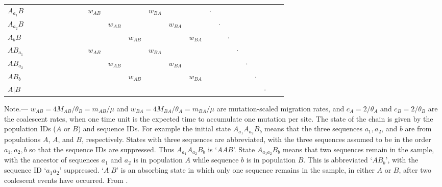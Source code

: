 \documentclass{article1}
\begin{document}
\begin{table}
\begin{small}
\begin{tabular}{lccccccccccccccccccccccc}
			$A_{a_1}B$ & & & & & & & & & $w_{AB}$ & & & $w_{BA}$ & & & $\cdot$ & & & & & & \\
			$A_{a_2}B$ & & & & & & & & & & $w_{AB}$ & & & $w_{BA}$ & & & $\cdot$ & & & & & \\
			$A_bB$ & & & & & & & & & & & $w_{AB}$ & & & $w_{BA}$ & & & $\cdot$ & & & & \\
			$AB_{a_1}$ & & & & & & & & & $w_{AB}$ & & & $w_{BA}$ & & & & & & $\cdot$ & & & \\
			$AB_{a_2}$ & & & & & & & & & & $w_{AB}$ & & & $w_{BA}$ & & & & & & $\cdot$ & & \\
			$AB_b$ & & & & & & & & & & & $w_{AB}$ & & & $w_{BA}$ & & & & & & $\cdot$ & \\
			$A|B$ & & & & & & & & & & & & & & & & & & & & & $\cdot$ \\
			\bottomrule
		\end{tabular}
		
		\noindent Note.--- $w_{AB} = 4M_{AB}/\theta_B = m_{AB}/\mu$ and $w_{BA} =
		4M_{BA}/\theta_A = m_{BA}/\mu$ are mutation-scaled migration rates, and $c_A =
		2/\theta_A$ and $c_B = 2/\theta_B$ are the coalescent rates, when one time unit is the
		expected time to accumulate one mutation per site.  The state of the chain is given by
		the population IDs ($A$ or $B$) and sequence IDs. For example the initial state
		$A_{a_1}A_{a_2}B_b$ means that the three sequences $a_1, a_2$, and $b$ are from
		populations $A$, $A$, and $B$, respectively.  States with three sequences are
		abbreviated, with the three sequences assumed to be in the order $a_1, a_2, b$ so that
		the sequence IDs are suppressed.  Thus $A_{a_1}A_{a_2}B_b$ is `$AAB$'.  State
		$A_{a_1a_2}B_b$ means that two sequences remain in the sample, with the ancestor of
		sequences $a_1$ and $a_2$ is in population $A$ while sequence $b$ is in population
		$B$. This is abbreviated `$AB_b$', with the sequence ID `$a_1a_2$' suppressed. `$A|B$'
		is an absorbing state in which only one sequence remains in the sample, in either $A$
		or $B$, after two coalescent events have occurred.  From \citet{Leache2019}.
	\end{small}
\end{table}
\end{document}
